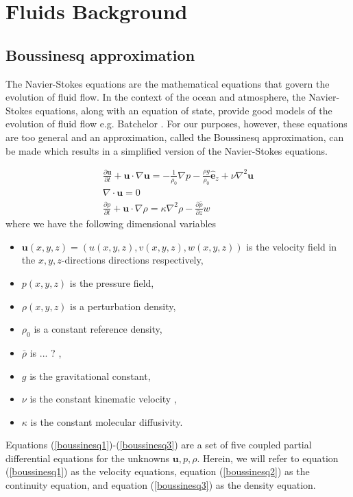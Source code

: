 \chapter{Fluids Background}
\section{Boussinesq approximation}

The Navier-Stokes equations are the mathematical equations that govern the evolution of fluid flow. In the context of the ocean and atmosphere, the Navier-Stokes equations, along with an equation of state, provide good models of the evolution of fluid flow e.g. Batchelor \cite{batchelor}. For our purposes, however, these equations are too general and an approximation, called the Boussinesq approximation, can be made which results in a simplified version of the Navier-Stokes equations.


\begin{align} 
\frac{\partial \bm{u}}{\partial t} + \bm{u}\cdot \nabla \bm{u} = -\frac{1}{\rho_{0}}\nabla p - \frac{\rho g}{\rho_{0}}\hat{\bm{e}}_{z} + \nu \nabla^{2}\bm{u} \label{boussinesq1}\\
\nabla \cdot \bm{u} =0 \label{boussinesq2}\\
\frac{\partial \rho}{\partial t} + \bm{u}\cdot \nabla \rho = \kappa \nabla^{2}\rho - \frac{\partial \bar{\rho}}{\partial z} w\label{boussinesq3}
\end{align}
where we have the following dimensional variables
\begin{itemize}
\item $\textbf{u}(x,y,z)=(u(x,y,z),v(x,y,z),w(x,y,z))$ is the velocity field in the $x,y,z$-directions directions respectively,
\item $p(x,y,z)$ is the pressure field,
\item $\rho(x,y,z)$ is a perturbation density,
\item $\rho_{0}$ is a constant reference density,
\item $\bar{\rho}$ is ... ? ,
\item $g$ is the gravitational constant,
\item $\nu$ is the constant kinematic velocity ,
\item $\kappa$ is the constant molecular diffusivity.
\end{itemize}
Equations (\ref{boussinesq1})-(\ref{boussinesq3}) are a set of five coupled partial differential equations for the unknowns $\textbf{u},p,\rho$. Herein, we will refer to equation (\ref{boussinesq1}) as the velocity equations, equation (\ref{boussinesq2}) as the continuity equation, and equation (\ref{boussinesq3}) as the density equation. 

